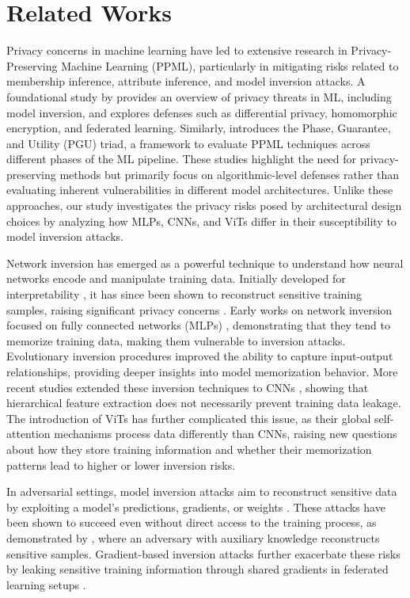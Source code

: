 \section{Related Works}
Privacy concerns in machine learning have led to extensive research in Privacy-Preserving Machine Learning (PPML), particularly in mitigating risks related to membership inference, attribute inference, and model inversion attacks. A foundational study by \cite{8677282} provides an overview of privacy threats in ML, including model inversion, and explores defenses such as differential privacy, homomorphic encryption, and federated learning. Similarly, \cite{xu2021privacypreservingmachinelearningmethods} introduces the Phase, Guarantee, and Utility (PGU) triad, a framework to evaluate PPML techniques across different phases of the ML pipeline. These studies highlight the need for privacy-preserving methods but primarily focus on algorithmic-level defenses rather than evaluating inherent vulnerabilities in different model architectures. Unlike these approaches, our study investigates the privacy risks posed by architectural design choices by analyzing how MLPs, CNNs, and ViTs differ in their susceptibility to model inversion attacks.

Network inversion has emerged as a powerful technique to understand how neural networks encode and manipulate training data. Initially developed for interpretability \cite{KINDERMANN1990277,784232}, it has since been shown to reconstruct sensitive training samples, raising significant privacy concerns \cite{Wong2017NeuralNI,ad}. Early works on network inversion focused on fully connected networks (MLPs) \cite{KINDERMANN1990277,SAAD200778}, demonstrating that they tend to memorize training data, making them vulnerable to inversion attacks. Evolutionary inversion procedures \cite{784232} improved the ability to capture input-output relationships, providing deeper insights into model memorization behavior. More recent studies extended these inversion techniques to CNNs \cite{ad}, showing that hierarchical feature extraction does not necessarily prevent training data leakage. The introduction of ViTs has further complicated this issue, as their global self-attention mechanisms process data differently than CNNs, raising new questions about how they store training information and whether their memorization patterns lead to higher or lower inversion risks.

In adversarial settings, model inversion attacks aim to reconstruct sensitive data by exploiting a model's predictions, gradients, or weights \cite{ad,kumar2019modelinversionnetworksmodelbased}. These attacks have been shown to succeed even without direct access to the training process, as demonstrated by \cite{9833677}, where an adversary with auxiliary knowledge reconstructs sensitive samples. Gradient-based inversion attacks further exacerbate these risks by leaking sensitive training information through shared gradients in federated learning setups \cite{pmlr-v206-wang23g}.

